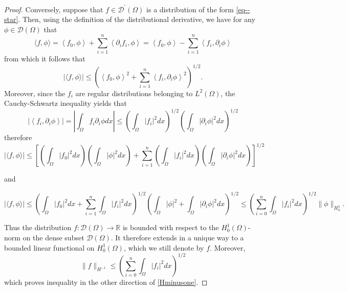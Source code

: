 \documentclass[11pt]{article}
\begin{document}
\begin{proof}
                Conversely, suppose that \(f \in \mathcal{D}^{\prime}(\Omega)\) is a distribution of the form \eqref{eq--star}. Then,
                using the definition of the distributional derivative, we have for any \(\phi \in \mathcal{D}(\Omega)\) that
                $$\langle f, \phi\rangle=\left\langle f_{0}, \phi\right\rangle+\sum_{i=1}^{n}\left\langle\partial_{i} f_{i}, \phi\right\rangle=\left\langle f_{0}, \phi\right\rangle-\sum_{i=1}^{n}\left\langle f_{i}, \partial_{i} \phi\right\rangle$$
                from which it follows that
                $$|\langle f, \phi\rangle| \leq\left(\left\langle f_{0}, \phi\right\rangle^{2}+\sum_{i=1}^{n}\left\langle f_{i}, \partial_{i} \phi\right\rangle^{2}\right)^{1 / 2}.$$
                Moreover, since the \(f_{i}\) are regular distributions belonging to \(L^{2}(\Omega)\), the Cauchy-Schwartz inequality yields that
                $$
                \left|\left\langle f_{i}, \partial_{i} \phi\right\rangle\right|=\left|\int_{\Omega} f_{i} \partial_{i} \phi d x\right| \leq\left(\int_{\Omega} |f_{i}|^{2} d x\right)^{1 / 2}\left(\int_{\Omega} |\partial_{i} \phi|^{2} d x\right)^{1 / 2}
                $$
                therefore
                $$
                |\langle f, \phi\rangle| \leq\left[\left(\int_{\Omega} |f_{0}|^{2} d x\right)\left(\int_{\Omega} |\phi|^{2} d x\right)+\sum_{i=1}^{n}\left(\int_{\Omega} |f_{i}|^{2} d x\right)\left(\int_{\Omega} |\partial_{i} \phi|^{2} d x\right)\right]^{1 / 2}
                $$
                
                and
                
                $$|\langle f, \phi\rangle| \leq\left(\int_{\Omega} |f_{0}|^{2} d x+\sum_{i=1}^{n} \int_{\Omega} |f_{i}|^{2} d x\right)^{1 / 2}\left(\int_{\Omega} |\phi|^{2}+\int_{\Omega} |\partial_{i} \phi|^{2} d x\right)^{1 / 2} \leq\left(\sum_{i=0}^{n} \int_{\Omega} |f_{i}|^{2} d x\right)^{1 / 2}\|\phi\|_{H_{0}^{1}}. $$
                
                Thus the distribution \(f: \mathcal{D}(\Omega) \rightarrow \mathbb{R}\) is bounded with respect to the \(H_{0}^{1}(\Omega)\)-norm
                on the dense subset \(\mathcal{D}(\Omega) .\) It therefore extends in a unique way to a bounded linear
                functional on \(H_{0}^{1}(\Omega)\), which we still denote by \(f .\) Moreover,
                $$
                \|f\|_{H^{-1}} \leq\left(\sum_{i=0}^{n} \int_{\Omega} |f_{i}|^{2} d x\right)^{1 / 2}
                $$
                which proves inequality in the other direction of \eqref{Hminusone}.
			\end{proof}
\end{document}
